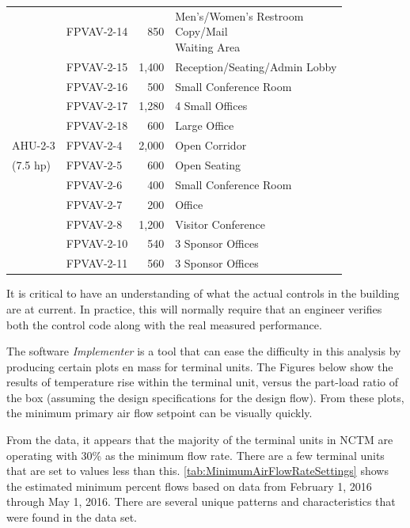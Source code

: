 \begin{table}[]
\begin{tabular}{@{}llrl@{}}
               & FPVAV-2-14 & 850 & \pbox{\textwidth}{Men's/Women's Restroom \\ Copy/Mail \\ Waiting Area }\\  \cmidrule(r){2-4}
               & FPVAV-2-15 & 1,400 & Reception/Seating/Admin Lobby \\  \cmidrule(r){2-4}
               & FPVAV-2-16 & 500 & Small Conference Room \\  \cmidrule(r){2-4}
               & FPVAV-2-17 & 1,280 & 4 Small Offices \\  \cmidrule(r){2-4}
               & FPVAV-2-18 & 600 & Large Office \\\midrule
AHU-2-3  & FPVAV-2-4 & 2,000 & Open Corridor \\  \cmidrule(r){2-4}
        (7.5 hp)       & FPVAV-2-5 & 600 & Open Seating \\  \cmidrule(r){2-4}
               & FPVAV-2-6 & 400 & Small Conference Room \\  \cmidrule(r){2-4}
               & FPVAV-2-7 & 200 & Office \\  \cmidrule(r){2-4}
               & FPVAV-2-8 & 1,200 & Visitor Conference \\  \cmidrule(r){2-4}
               & FPVAV-2-10 & 540 & 3 Sponsor Offices \\  \cmidrule(r){2-4}
               & FPVAV-2-11 & 560 & 3 Sponsor Offices \\ \bottomrule
\end{tabular}
\end{table}

It is critical to have an understanding of what the actual controls in the building are at current. In practice, this will normally require that an engineer verifies both the control code along with the real measured performance.

The software \textit{Implementer} is a tool that can ease the difficulty in this analysis by producing certain plots en mass for terminal units. The Figures below show the results of temperature rise within the terminal unit, versus the part-load ratio of the box (assuming the design specifications for the design flow). From these plots, the minimum primary air flow setpoint can be visually quickly.

From the data, it appears that the majority of the terminal units in NCTM are operating with 30\% as the minimum flow rate. There are a few terminal units that are set to values less than this. \tableref{} \ref{tab:MinimumAirFlowRateSettings} shows the estimated minimum percent flows based on data from February 1, 2016 through May 1, 2016. There are several unique patterns and characteristics that were found in the data set.



